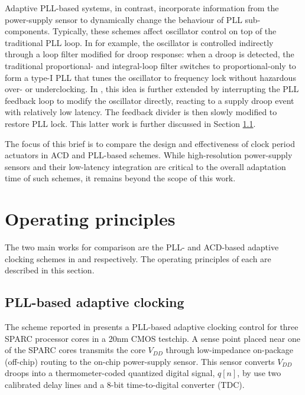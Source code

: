 \documentclass[twoside,9pt,journal,letterpage]{IEEEtran}
\begin{document}
Adaptive PLL-based systems, in contrast, incorporate information from the power-supply sensor to dynamically change the behaviour of PLL sub-components. Typically, these schemes affect oscillator control on top of the traditional PLL loop. In \cite{ahmad2017} for example, the oscillator is controlled indirectly through a loop filter modified for droop response: when a droop is detected, the traditional proportional- and integral-loop filter switches to proportional-only to form a type-I PLL that tunes the oscillator to frequency lock without hazardous over- or underclocking. In \cite{hashimoto2018}, this idea is further extended by interrupting the PLL feedback loop to modify the oscillator directly, reacting to a supply droop event with relatively low latency. The feedback divider is then slowly modified to restore PLL lock. This latter work is further discussed in Section \ref{sec:details_pll}.

The focus of this brief is to compare the design and effectiveness of clock period actuators in ACD and PLL-based schemes. While high-resolution power-supply sensors and their low-latency integration are critical to the overall adaptation time of such schemes, it remains beyond the scope of this work.

\section{Operating principles}
\label{sec:details}
The two main works for comparison are the PLL- and ACD-based adaptive clocking schemes in \cite{hashimoto2018} and \cite{wilcox2015} respectively. The operating principles of each are described in this section.

\subsection{PLL-based adaptive clocking}
\label{sec:details_pll}
The scheme reported in \cite{hashimoto2018} presents a PLL-based adaptive clocking control for three SPARC processor cores in a 20nm CMOS testchip. A sense point placed near one of the SPARC cores transmits the core $V_{DD}$ through low-impedance on-package (off-chip) routing to the on-chip power-supply sensor. This sensor converts $V_{DD}$ droops into a thermometer-coded quantized digital signal, $q[n]$, by use two calibrated delay lines and a 8-bit time-to-digital converter (TDC). 
\end{document}
